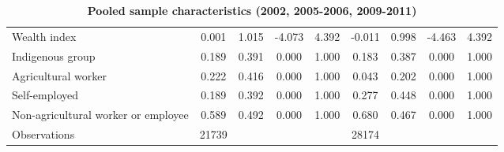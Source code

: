 \begin{table}[h!]
\begin{center}
{\begin{tabular}{l*{2}{cccc}}
Wealth index        &       0.001&       1.015&      -4.073&       4.392&      -0.011&       0.998&      -4.463&       4.392\\
Indigenous group    &       0.189&       0.391&       0.000&       1.000&       0.183&       0.387&       0.000&       1.000\\
Agricultural worker &       0.222&       0.416&       0.000&       1.000&       0.043&       0.202&       0.000&       1.000\\
Self-employed       &       0.189&       0.392&       0.000&       1.000&       0.277&       0.448&       0.000&       1.000\\
Non-agricultural worker or employee&       0.589&       0.492&       0.000&       1.000&       0.680&       0.467&       0.000&       1.000\\
\midrule
Observations        &       21739&            &            &            &       28174&            &            &            \\
\bottomrule
\end{tabular} }
\caption{\label{tab:Pooled-sample-characteristics}\textbf{Pooled sample characteristics
(2002, 2005-2006, 2009-2011) }}
\end{center}
\end{table}

